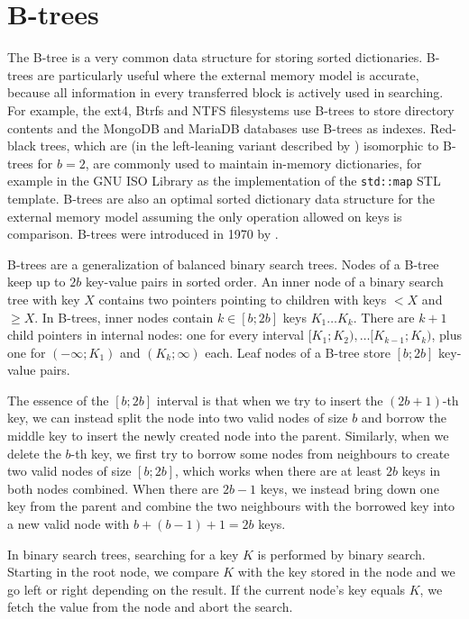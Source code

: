 \chapter{B-trees}
\label{chapter:btree}
The B-tree is a very common data structure for storing sorted dictionaries.
B-trees are particularly useful where the external memory model is accurate,
because all information in every transferred block is actively used
in searching. For example, the ext4, Btrfs and NTFS filesystems use B-trees
to store directory contents and the MongoDB and MariaDB databases use B-trees
as indexes. Red-black trees, which are (in the left-leaning variant
described by \cite{left-leaning}) isomorphic to B-trees for $b=2$, are
commonly used to maintain in-memory dictionaries, for example in the GNU ISO
\Cpp Library as the implementation of the \texttt{std::map} STL template.
B-trees are also an optimal sorted dictionary data structure
for the external memory model assuming the only operation allowed on
keys is comparison.
B-trees were introduced in 1970 by \cite{btree}.

B-trees are a generalization of balanced binary search trees.
Nodes of a B-tree keep up to $2b$ key-value pairs in sorted order.
An inner node of a binary search tree with key $X$ contains two pointers
pointing to children with keys $< X$ and $\geq X$. In B-trees,
inner nodes contain $k\in[b;2b]$ keys $K_1\ldots K_k$. There are $k+1$
child pointers in internal nodes: one for every interval
$[K_1;K_2),\ldots [K_{k-1};K_k)$, plus one for $(-\infty;K_1)$ and
$(K_k;\infty)$ each.
Leaf nodes of a B-tree store $[b;2b]$ key-value pairs.

The essence of the $[b;2b]$ interval is that when we try to insert
the $(2b+1)$-th key, we can instead split the node into two valid nodes of size
$b$ and borrow the middle key to insert the newly created node into the parent.
Similarly, when we delete the $b$-th key, we first try to borrow some nodes
from neighbours to create two valid nodes of size $[b;2b]$, which works when
there are at least $2b$ keys in both nodes combined.
When there are $2b-1$ keys, we instead bring down one key from the parent
and combine the two neighbours with the borrowed key into a new valid node with
$b+(b-1)+1=2b$ keys.

In binary search trees, searching for a key $K$ is performed by binary search.
Starting in the root node, we compare $K$ with the key stored in the node
and we go left or right depending on the result. If the current node's key
equals $K$, we fetch the value from the node and abort the search.

